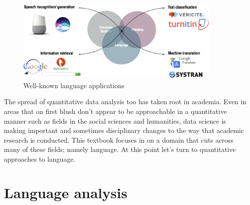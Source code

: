 \documentclass[
  letterpaper,
]{latex/krantz}
\begin{document}
\begin{figure}

{\centering \includegraphics[width=0.9\textwidth,height=\textheight]{./figures/text-analysis/well-known-language-applications.png}

}

\caption{\label{fig-intro-language-applications}Well-known language
applications}

\end{figure}

The spread of quantitative data analysis too has taken root in academia.
Even in areas that on first blush don't appear to be approachable in a
quantitative manner such as fields in the social sciences and
humanities, data science is making important and sometimes disciplinary
changes to the way that academic research is conducted. This textbook
focuses in on a domain that cuts across many of these fields; namely
language. At this point let's turn to quantitative approaches to
language.

\hypertarget{language-analysis}{%
\section{Language analysis}\label{language-analysis}}
\end{document}
